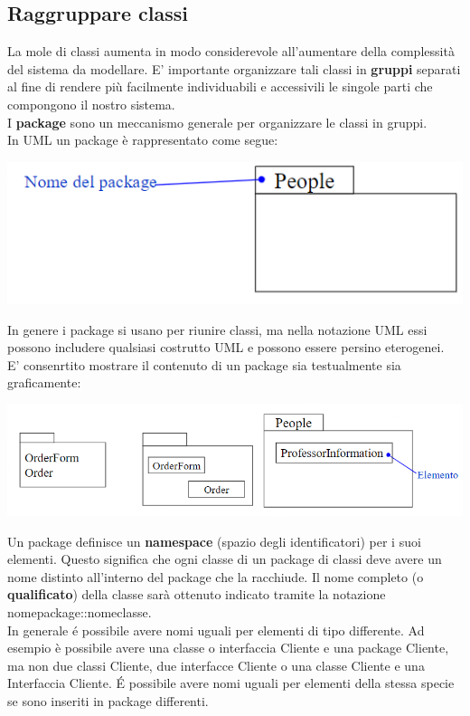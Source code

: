 \documentclass{article}
\begin{document}
	\subsection{Raggruppare classi}
	La mole di classi aumenta in modo considerevole all'aumentare della complessità del sistema da modellare. E' importante organizzare tali classi in \textbf{gruppi} separati al fine di rendere più facilmente individuabili e accessivili le singole parti che compongono il nostro sistema. \\		
	I \textbf{package} sono un meccanismo generale per organizzare le classi in gruppi. \\
	In UML un package è rappresentato come segue:
	\begin{center}
		\includegraphics[scale=0.5]{assets/package_uml.png}
	\end{center}
	In genere i package si usano per riunire classi, ma nella notazione UML essi possono includere qualsiasi costrutto UML e possono essere persino eterogenei. \\
	E' consenrtito mostrare il contenuto di un package sia testualmente sia graficamente:
	\begin{center}
		\includegraphics[scale=0.5]{assets/package_uml_contenuto.png}
	\end{center}
	Un package definisce un \textbf{namespace} (spazio degli identificatori) per i suoi elementi. Questo significa che ogni classe di un package di classi deve avere un nome distinto all'interno del package che la racchiude. Il nome completo (o \textbf{qualificato}) della classe sarà ottenuto indicato tramite la notazione nomepackage::nomeclasse. \\
	In generale é possibile avere nomi uguali per elementi di tipo differente. Ad esempio è possibile avere una classe o interfaccia Cliente e una package Cliente, ma non due classi Cliente, due interfacce Cliente o una classe Cliente e una Interfaccia Cliente. É possibile avere nomi uguali per elementi della stessa specie se sono inseriti in package differenti. \\
\end{document}
